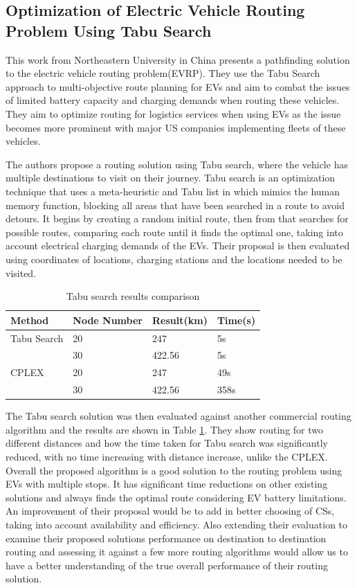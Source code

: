 \documentclass[11pt]{report}
\begin{document}
\subsection{Optimization of Electric Vehicle Routing Problem Using Tabu Search \autocite{optimizationTabuSearch}}

This work from Northeastern University in China presents a pathfinding solution to the electric vehicle routing problem(EVRP). They use the Tabu Search approach to multi-objective route planning for EVs and aim to combat the issues of limited battery capacity and charging demands when routing these vehicles. They aim to optimize routing for logistics services when using EVs as the issue becomes more prominent with major US companies implementing fleets of these vehicles.

The authors propose a routing solution using Tabu search, where the vehicle has multiple destinations to visit on their journey. Tabu search is an optimization technique that uses a meta-heuristic and Tabu list in which mimics the human memory function, blocking all areas that have been searched in a route to avoid detours. It begins by creating a random initial route, then from that searches for possible routes, comparing each route until it finds the optimal one, taking into account electrical charging demands of the EVs. Their proposal is then evaluated using coordinates of locations, charging stations and the locations needed to be visited.

\begin{table}[h!]
\begin{center}
\begin{tabular}{|p{3cm} p{3cm} p{3cm} p{3cm}|} 
 \hline
 Method & Node Number & Result(km) & Time(s) \\
 \hline
 Tabu Search & 20 & 247 & 5s \\ 
 & 30 & 422.56 & 5s \\
 CPLEX & 20 & 247 & 49s \\
  & 30 & 422.56 & 358s \\
 \hline
\end{tabular}
\end{center}
\caption{Tabu search results comparison \autocite{optimizationTabuSearch}}
\label{table:2}
\end{table}

The Tabu search solution was then evaluated against another commercial routing algorithm and the results are shown in Table \ref{table:2}. They show routing for two different distances and how the time taken for Tabu search was significantly reduced, with no time increasing with distance increase, unlike the CPLEX. Overall the proposed algorithm is a good solution to the routing problem using EVs with multiple stops. It has significant time reductions on other existing solutions and always finds the optimal route considering EV battery limitations. An improvement of their proposal would be to add in better choosing of CSs, taking into account availability and efficiency. Also extending their evaluation to examine their proposed solutions performance on destination to destination routing and assessing it against a few more routing algorithms would allow us to have a better understanding of the true overall performance of their routing solution. 
\end{document}
